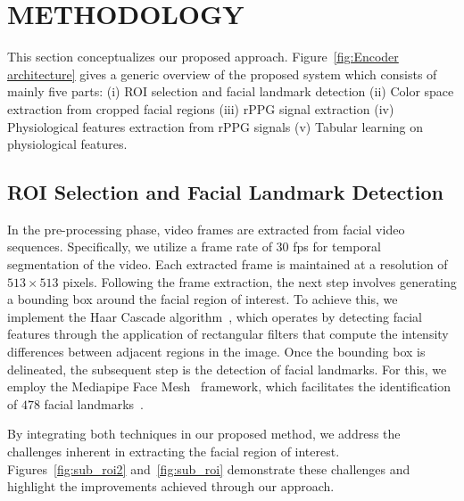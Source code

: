\section{METHODOLOGY}

This section conceptualizes our proposed approach. Figure~\ref{fig:Encoder architecture} gives a generic overview of the proposed system which consists of mainly five parts: (i) ROI selection and facial landmark detection (ii) Color space extraction from cropped facial regions (iii) rPPG signal extraction (iv) Physiological features extraction from rPPG signals (v) Tabular learning on physiological features.


\subsection{ROI Selection and Facial Landmark Detection}
In the pre-processing phase, video frames are extracted from facial video sequences. Specifically, we utilize a frame rate of $30$ fps for temporal segmentation of the video. Each extracted frame is maintained at a resolution of $513 \times 513$ pixels. Following the frame extraction, the next step involves generating a bounding box around the facial region of interest. To achieve this, we implement the Haar Cascade algorithm~\cite{choi2022face}, which operates by detecting facial features through the application of rectangular filters that compute the intensity differences between adjacent regions in the image. Once the bounding box is delineated, the subsequent step is the detection of facial landmarks. For this, we employ the Mediapipe Face Mesh~\cite{lugaresi2019mediapipe} framework, which facilitates the identification of $478$ facial landmarks~\cite{ziaratnia2024multimodal}.

By integrating both techniques in our proposed method, we address the challenges inherent in extracting the facial region of interest. Figures~\ref{fig:sub_roi2} and~\ref{fig:sub_roi} demonstrate these challenges and highlight the improvements achieved through our approach.

